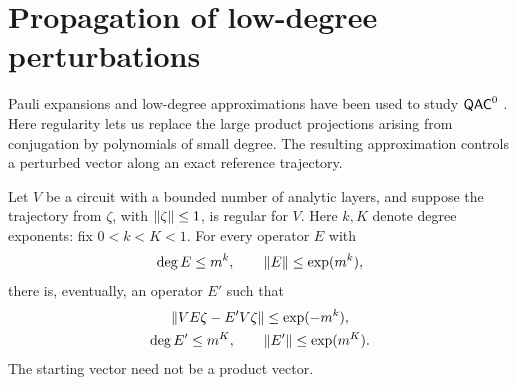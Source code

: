 \section{Propagation of low-degree perturbations}
\label{sec:propagation}

Pauli expansions and low-degree approximations have been used to study
$\mathsf{QAC}^{0}$ \citep{NadimpalliParhamVasconcelosYuen2024,
AnshuDongOuYao2025,DongOuYao2025}.
Here regularity lets us replace the large product projections arising
from conjugation by polynomials of small degree.  The resulting
approximation controls a perturbed vector along an exact reference
trajectory.

\begin{proposition}
\label{prop:propagation}
Let $V$ be a circuit with a bounded number of analytic layers, and suppose
the trajectory from $\zeta$, with $\lVert\zeta\rVert\le 1$, is regular for $V$.
Here $k,K$ denote degree exponents: fix $0<k<K<1$.  For every operator $E$
with
\[
 \deg E\le m^k,
 \qquad \lVert E\rVert\le \exp(m^k),
\]
there is, eventually, an operator $E'$ such that
\begin{equation}
 \label{eq:propagation}
 \begin{gathered}
  \lVert VE\zeta-E'V\zeta\rVert\le \exp(-m^k),\\
  \deg E'\le m^K,
  \qquad \lVert E'\rVert\le \exp(m^K).
 \end{gathered}
\end{equation}
The starting vector need not be a product vector.
\end{proposition}

